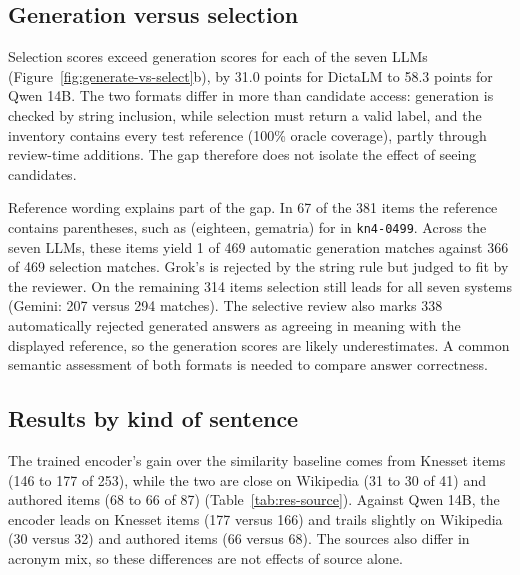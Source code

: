 \subsection{Generation versus selection}
\label{sec:res-formats}
Selection scores exceed generation scores for each of the seven LLMs (Figure~\ref{fig:generate-vs-select}b), by 31.0 points for DictaLM to 58.3 points for Qwen 14B. The two formats differ in more than candidate access: generation is checked by string inclusion, while selection must return a valid label, and the inventory contains every test reference (100\% oracle coverage), partly through review-time additions. The gap therefore does not isolate the effect of seeing candidates.

Reference wording explains part of the gap. In 67 of the 381 items the reference contains parentheses, such as  (eighteen, gematria) for  in \texttt{kn4-0499}. Across the seven LLMs, these items yield 1 of 469 automatic generation matches against 366 of 469 selection matches. Grok's  is rejected by the string rule but judged to fit by the reviewer. On the remaining 314 items selection still leads for all seven systems (Gemini: 207 versus 294 matches). The selective review also marks 338 automatically rejected generated answers as agreeing in meaning with the displayed reference, so the generation scores are likely underestimates. A common semantic assessment of both formats is needed to compare answer correctness.

\subsection{Results by kind of sentence}
\label{sec:res-source}
The trained encoder's gain over the similarity baseline comes from Knesset items (146 to 177 of 253), while the two are close on Wikipedia (31 to 30 of 41) and authored items (68 to 66 of 87) (Table~\ref{tab:res-source}). Against Qwen 14B, the encoder leads on Knesset items (177 versus 166) and trails slightly on Wikipedia (30 versus 32) and authored items (66 versus 68). The sources also differ in acronym mix, so these differences are not effects of source alone.

